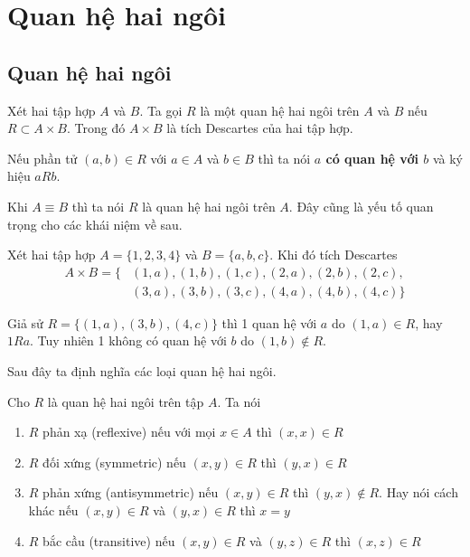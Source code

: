 \chapter{Quan hệ hai ngôi}

\section{Quan hệ hai ngôi}

\begin{definition}
    Xét hai tập hợp $A$ và $B$. Ta gọi $R$ là một quan hệ hai ngôi trên $A$
    và $B$ nếu $R \subset A \times B$. Trong đó $A \times B$ là tích Descartes
    của hai tập hợp.
\end{definition}

Nếu phần tử $(a, b) \in R$ với $a \in A$ và $b \in B$ thì ta nói
\textbf{$a$ có quan hệ với $b$} và ký hiệu $a R b$.

Khi $A \equiv B$ thì ta nói $R$ là quan hệ hai ngôi trên $A$. Đây cũng là
yếu tố quan trọng cho các khái niệm về sau.

\begin{example}
    Xét hai tập hợp $A = \{1, 2, 3, 4\}$ và $B = \{a, b, c\}$. 
    Khi đó tích Descartes 
    \begin{align*}
        A \times B = \{
        & (1, a), (1, b), (1, c), (2, a), (2, b), (2, c), \\
        & (3, a), (3, b), (3, c), (4, a), (4, b), (4, c)
    \}
    \end{align*}

    Giả sử $R = \{(1, a), (3, b), (4, c)\}$ thì 1 quan hệ với $a$ do
    $(1, a) \in R$, hay $1 R a$. Tuy nhiên 1 không có quan hệ với $b$
    do $(1, b) \not\in R$.
\end{example}

Sau đây ta định nghĩa các loại quan hệ hai ngôi.

\begin{definition}
    Cho $R$ là quan hệ hai ngôi trên tập $A$. Ta nói
    \begin{enumerate}
        \item $R$ phản xạ (reflexive) nếu với mọi $x \in A$ thì $(x, x) \in R$
        \item $R$ đối xứng (symmetric) nếu $(x, y) \in R$ thì $(y, x) \in R$
        \item $R$ phản xứng (antisymmetric) nếu $(x, y) \in R$ thì $(y, x) \not\in R$.
        Hay nói cách khác nếu $(x, y) \in R$ và $(y, x) \in R$ thì $x = y$
        \item $R$ bắc cầu (transitive) nếu $(x, y) \in R$ và $(y, z) \in R$ thì $(x, z) \in R$
    \end{enumerate}
\end{definition}

